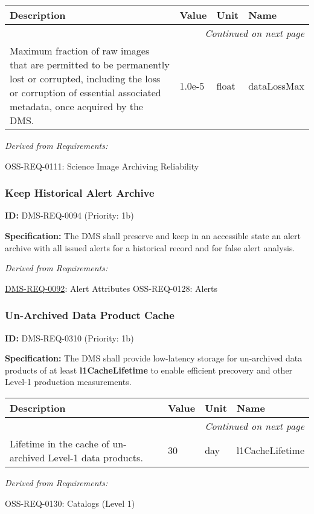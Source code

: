 \documentclass[SE,toc,lsstdraft]{lsstdoc}
\makeatletter
\newcommand{\paramname}[1]{\hspace{0pt}#1}
\newcommand{\unitname}[1]{\hspace{0pt}#1}
\newenvironment{parameters}[0]{%
\setlength\LTleft{0pt}
\setlength\LTright{\fill}
\begin{small}
\begin{longtable}[]{|p{0.49\textwidth}|l|p{0.6in}|p{1.70in}@{}|}

\hline \textbf{Description} & \textbf{Value} & \textbf{Unit} & \textbf{Name} \\ \hline
\endhead

\hline \multicolumn{4}{r}{\emph{Continued on next page}} \\
\endfoot

\hline\hline
\endlastfoot
}{%
\hline
\end{longtable}
\end{small}
}
\makeatother
\begin{document}
\begin{parameters}
Maximum fraction of raw images that are permitted to be permanently lost or corrupted, including the loss or corruption of essential associated metadata, once acquired by the DMS.
&
1.0e-5
&
\unitname{%
float
}
&
\paramname{%
dataLossMax
} \\\hline
\end{parameters}

\emph{Derived from Requirements:}

OSS-REQ-0111:
Science Image Archiving Reliability \newline

\subsubsection{Keep Historical Alert Archive}

\label{DMS-REQ-0094}
\textbf{ID:} DMS-REQ-0094 (Priority: 1b)

\textbf{Specification: }The DMS shall preserve and keep in an accessible state an alert archive with all issued alerts for a historical record and for false alert analysis.

\emph{Derived from Requirements:}

\hyperref[DMS-REQ-0092]{DMS-REQ-0092}:
Alert Attributes \newline
OSS-REQ-0128:
Alerts \newline

\subsubsection{Un-Archived Data Product Cache}

\label{DMS-REQ-0310}
\textbf{ID:} DMS-REQ-0310 (Priority: 1b)

\textbf{Specification:} The DMS shall provide low-latency storage for un-archived data products of at least \textbf{l1CacheLifetime }to enable efficient precovery and other Level-1 production measurements.

\begin{parameters}
Lifetime in the cache of un-archived Level-1 data products.
&
30
&
\unitname{%
day
}
&
\paramname{%
l1CacheLifetime
} \\\hline
\end{parameters}

\emph{Derived from Requirements:}

OSS-REQ-0130:
Catalogs (Level 1) \newline
\end{document}
